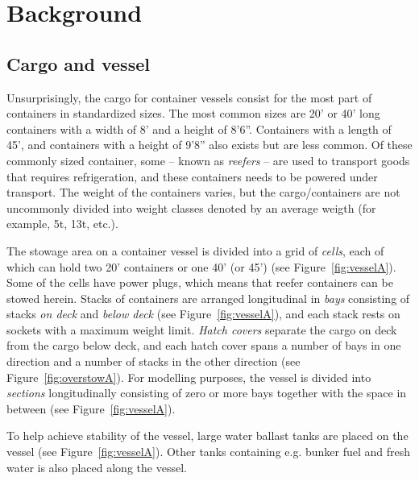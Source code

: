 \section{Background}\label{sec:stowage}%
\subsection{Cargo and vessel}
Unsurprisingly, the cargo for container vessels consist for the most part of containers in standardized sizes. The most common sizes are 20' or 40' long containers with a width of 8' and a height of 8'6''. Containers with a length of 45', and containers with a height of 9'8'' also exists but are less common. Of these commonly sized container, some -- known as \emph{reefers} -- are used to transport goods that requires refrigeration, and these containers needs to be powered under transport.  The weight of the containers varies, but the cargo/containers are not uncommonly divided into weight classes denoted by an average weigth (for example, 5t, 13t, etc.).

The stowage area on a container vessel is divided into a grid of \emph{cells}, each of which can hold two 20' containers or one 40' (or 45') (see Figure~\ref{fig:vesselA}). Some of the cells have power plugs, which means that reefer containers can be stowed herein. 
Stacks of containers are arranged longitudinal in \emph{bays} consisting of stacks \emph{on deck} and \emph{below deck} (see Figure~\ref{fig:vesselA}), and each stack rests on sockets with a maximum weight limit. 
\emph{Hatch covers} separate the cargo on deck from the cargo below deck, and each hatch cover spans a number of bays in one direction and a number of stacks in the other direction (see Figure~\ref{fig:overstowA}).
For modelling purposes, the vessel is divided into \emph{sections} longitudinally consisting of zero or more bays together with the space in between (see Figure~\ref{fig:vesselA}). 

To help achieve stability of the vessel, large water ballast tanks are placed on the vessel (see Figure~\ref{fig:vesselA}). Other tanks containing e.g. bunker fuel and fresh water is also placed along the vessel.

